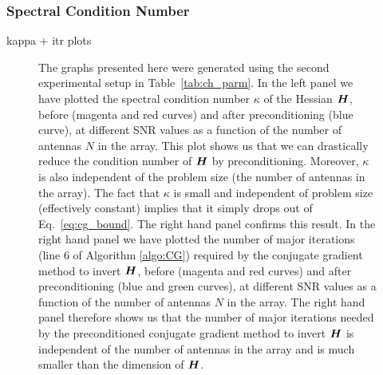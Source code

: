 \documentclass[useAMS,usenatbib]{mn2e}
\newcommand{\bH}{\bmath{H}}
\begin{document}
\subsubsection{Spectral Condition Number}
kappa + itr plots
\begin{figure}
\centering
{}
\caption{The graphs presented here were generated using the second experimental setup in Table~\ref{tab:ch_parm}. In the left panel we have plotted the spectral condition number $\kappa$ of the Hessian $\bH$, before (magenta and red curves) and after preconditioning (blue curve), at different SNR values as a function of the
number of antennas $N$ in the array. This plot shows us that we can drastically reduce the condition number of $\bH$ by preconditioning. Moreover, $\kappa$ is also
independent of the problem size (the number of antennas in the array). The fact that $\kappa$ is small and independent of problem size (effectively constant) implies that it simply drops out 
of Eq.~\eqref{eq:cg_bound}. The right hand panel confirms this result. In the right hand panel we have plotted the number of major iterations (line 6 of Algorithm \ref{algo:CG}) required by the conjugate 
gradient method to invert $\bH$, before (magenta and red curves) and after preconditioning (blue and green curves), at different SNR values as a function of the number of antennas $N$ in the array.  
The right hand panel therefore shows us that the number of major iterations needed by the preconditioned conjugate gradient method to invert $\bH$ is independent of the number of antennas in the array
and is much smaller than the dimension of $\bH$. 
\label{fig:kappa_itr}} 
\end{figure}
\end{document}
